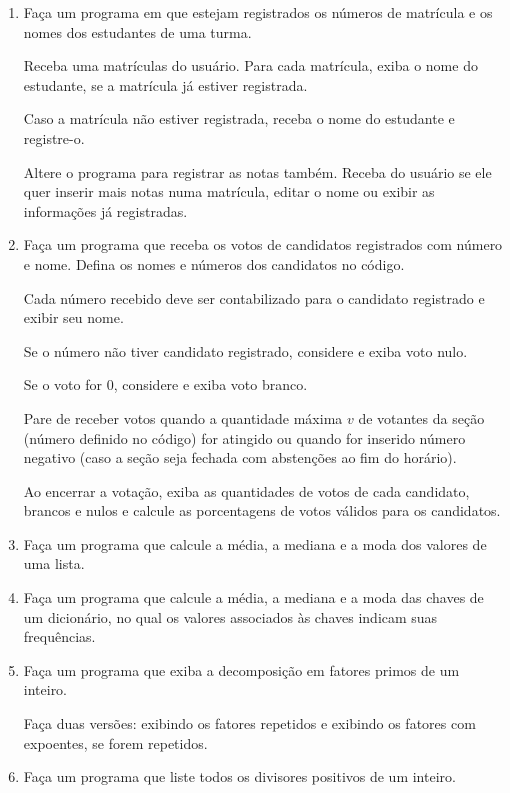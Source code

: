 \begin{enumerate}
	\item Faça um programa em que estejam registrados os números de matrícula e os nomes dos estudantes de uma turma. 
	
	Receba uma matrículas do usuário.
	Para cada matrícula, exiba o nome do estudante, se a matrícula já estiver registrada. 
	
	Caso a matrícula não estiver registrada, receba o nome do estudante e registre-o.
	
	Altere o programa para registrar as notas também.
	Receba do usuário se ele quer inserir mais notas numa matrícula, editar o nome ou exibir as informações já registradas.
	
	\item Faça um programa que receba os votos de candidatos registrados com número e nome. 
	Defina os nomes e números dos candidatos no código.
	
	Cada número recebido deve ser contabilizado para o candidato registrado e exibir seu nome.
	
	Se o número não tiver candidato registrado, considere e exiba voto nulo.
	
	Se o voto for 0, considere e exiba voto branco.
	
	Pare de receber votos quando a quantidade máxima $v$ de votantes da seção (número definido no código) 
	for atingido ou quando for inserido número negativo (caso a seção seja fechada com abstenções ao fim do horário).
	
	Ao encerrar a votação, exiba as quantidades de votos de cada candidato, brancos e nulos
	 e calcule as porcentagens de votos válidos para os candidatos.
	 
\quebra	 

	\item Faça um programa que calcule a média, a mediana e a moda dos valores de uma lista.

	\item Faça um programa que calcule a média, a mediana e a moda das chaves de um dicionário, no qual os valores associados às chaves indicam suas frequências.

	\item Faça um programa que exiba a decomposição em fatores primos de um inteiro. 
	
	Faça duas versões: exibindo os fatores repetidos e exibindo os fatores com expoentes, se forem repetidos. 
	
	\item Faça um programa que liste todos os divisores positivos de um inteiro.
	

\end{enumerate}

